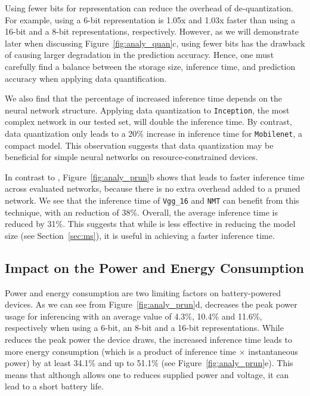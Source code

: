 Using fewer bits for representation can reduce the overhead of de-quantization. For example, using a 6-bit representation is 1.05x and
1.03x faster than using a 16-bit and a 8-bit representations, respectively. However, as we will demonstrate later when discussing
Figure~\ref{fig:analy_quan}c, using fewer bits has the drawback of causing larger degradation in the prediction accuracy. Hence, one must
carefully find a balance between the storage size, inference time, and prediction accuracy when applying data quantification.

We also find that the percentage of increased inference time depends on the neural network structure. Applying data quantization to
\texttt{Inception}, the most complex network in our \CNN tested set, will double the inference time. By contrast, data quantization only
leads to a 20\% increase in inference time for \texttt{Mobilenet}, a compact model. This observation suggests that data quantization may be
beneficial for simple neural networks on resource-constrained devices.


In contrast to \quantization, Figure~\ref{fig:analy_prun}b shows that \pruning leads to faster inference time across evaluated networks,
because there is no extra overhead added to a pruned network. We see that the inference time of \texttt{Vgg\_16} and \texttt{NMT} can
benefit from this technique, with an reduction of 38\%. Overall, the average inference time is reduced by 31\%. This suggests that while
\pruning is less effective in reducing the model size (see Section~\ref{sec:ms}), it is useful in achieving a faster inference time.

\subsection{Impact on the Power and Energy Consumption}
Power and energy consumption are two limiting factors on battery-powered devices. As we can see from Figure~\ref{fig:analy_prun}d,
\quantization decreases the peak power usage for inferencing with an average value of 4.3\%, 10.4\% and 11.6\%, respectively when using a
6-bit, an 8-bit and a 16-bit representations. While \quantization reduces the peak power the device draws, the increased inference time
leads to more energy consumption (which is a product of inference time $\times$ instantaneous power) by at least 34.1\% and up to 51.1\%
(see Figure~\ref{fig:analy_prun}e). This means that although \quantization allows one to reduces supplied power and voltage, it can lead to
a short battery life.

